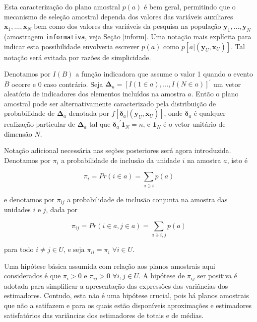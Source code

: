 \documentclass[]{book}
\numberwithin{example}{chapter}
\numberwithin{remark}{chapter}
\numberwithin{definition}{chapter}
\begin{document}
Esta caracterização do plano amostral \(p(a)\) é bem geral, permitindo
que o mecanismo de seleção amostral dependa dos valores das variáveis
auxiliares \(\mathbf{x}_1 ,\ldots, \mathbf{x}_N\) bem como dos valores
das variáveis da pesquisa na população
\(\mathbf{y}_1 ,\ldots, \mathbf{y}_N\) (amostragem \texttt{informativa},
veja Seção \ref{inform}. Uma notação mais explícita para indicar esta
possibilidade envolveria escrever \(p(a)\) como
\(p\left[ a | (\mathbf{y}_U , \mathbf{x}_U ) \right]\). Tal notação será
evitada por razões de simplicidade.

Denotamos por \(I(B)\) a função indicadora que assume o valor 1 quando o
evento \(B\) ocorre e 0 caso contrário. Seja
\(\mathbf{\Delta}_a = \left[ I(1 \in a) ,\ldots, I(N \in a)\right]^{\prime}\)
um vetor aleatório de indicadores dos elementos incluídos na amostra
\(a\). Então o plano amostral pode ser alternativamente caracterizado
pela distribuição de probabilidade de \(\mathbf{\Delta }_a\) denotada
por
\(f\left[ \mathbf{\delta }_a | \left(\mathbf{y}_U , \mathbf{x}_U \right) \right]\),
onde \(\mathbf{\delta }_a\) é qualquer realização particular de
\(\mathbf{\Delta }_a\) tal que
\({\mathbf{\delta}_a}^{\prime} \mathbf{1}_N = n\), e \(\mathbf{1}_N\) é
o vetor unitário de dimensão \(N\).

Notação adicional necessária nas seções posteriores será agora
introduzida. Denotamos por \(\pi_i\) a probabilidade de inclusão da
unidade \(i\) na amostra \(a\), isto é

\begin{equation}
\pi_i = Pr\left( i \in a \right) = \sum_{a \ni i} p(a)  \label{eq:ref5}
\end{equation}

e denotamos por \(\pi_{ij}\) a probabilidade de inclusão conjunta na
amostra das unidades \(i\) e \(j\), dada por

\begin{equation}
\pi_{ij} = Pr \left( i \in a , j \in a \right) = \sum_{a \ni i,j} p(a) \label{eq:ref6}
\end{equation}

para todo \(i \neq j \in U\), e seja \(\pi_{ii} = \pi_{i}\)
\(\forall i \in U.\)

Uma hipótese básica assumida com relação aos planos amostrais aqui
considerados é que \(\pi_i > 0\) e \(\pi_{ij} > 0\)
\(\forall i,j \in U.\) A hipótese de \(\pi_{ij}\) ser positiva é adotada
para simplificar a apresentação das expressões das variâncias dos
estimadores. Contudo, esta não é uma hipótese crucial, pois há planos
amostrais que não a satifazem e para os quais estão disponíveis
aproximações e estimadores satisfatórios das variâncias dos estimadores
de totais e de médias.
\end{document}
